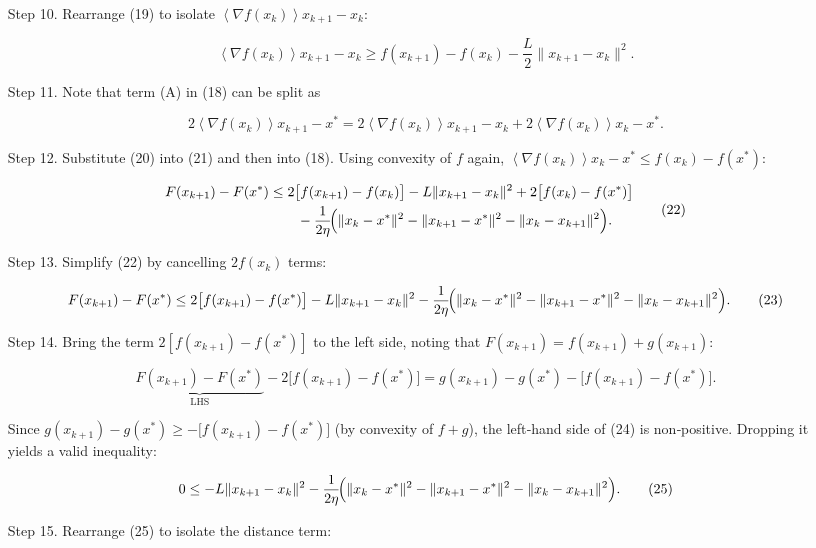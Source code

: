 \documentclass{article}
\newcommand{\inner}[1]{\left\langle #1\right\rangle}
\begin{document}
\begin{enumerate}
\item[Step 10.] Rearrange (19) to isolate $\inner{\nabla f(x_{k})}{x_{k+1}-x_{k}}$:

\[
\inner{\nabla f(x_{k})}{x_{k+1}-x_{k}}
\ge f(x_{k+1})-f(x_{k})-\frac{L}{2}\|x_{k+1}-x_{k}\|^{2}.
\tag{20}
\]

\item[Step 11.] Note that term (A) in (18) can be split as

\[
2\inner{\nabla f(x_{k})}{x_{k+1}-x^{*}}
=2\inner{\nabla f(x_{k})}{x_{k+1}-x_{k}}
+2\inner{\nabla f(x_{k})}{x_{k}-x^{*}}.
\tag{21}
\]

\item[Step 12.] Substitute (20) into (21) and then into (18).  Using convexity of $f$ again,
$\inner{\nabla f(x_{k})}{x_{k}-x^{*}}\le f(x_{k})-f(x^{*})$:

\[
\begin{aligned}
F(x_{k+1})-F(x^{*})
&\le
2\bigl[f(x_{k+1})-f(x_{k})\bigr]
- L\|x_{k+1}-x_{k}\|^{2}
+2\bigl[f(x_{k})-f(x^{*})\bigr] \\
&\qquad
-\frac{1}{2\eta}\!\Bigl(\|x_{k}-x^{*}\|^{2}-\|x_{k+1}-x^{*}\|^{2}
-\|x_{k}-x_{k+1}\|^{2}\Bigr).
\end{aligned}
\tag{22}
\]

\item[Step 13.] Simplify (22) by cancelling $2f(x_{k})$ terms:

\[
F(x_{k+1})-F(x^{*})
\le
2\bigl[f(x_{k+1})-f(x^{*})\bigr]
- L\|x_{k+1}-x_{k}\|^{2}
-\frac{1}{2\eta}\!\Bigl(\|x_{k}-x^{*}\|^{2}-\|x_{k+1}-x^{*}\|^{2}
-\|x_{k}-x_{k+1}\|^{2}\Bigr).
\tag{23}
\]

\item[Step 14.] Bring the term $2[f(x_{k+1})-f(x^{*})]$ to the left side, noting that $F(x_{k+1})=f(x_{k+1})+g(x_{k+1})$:

\[
\underbrace{F(x_{k+1})-F(x^{*})}_{\text{LHS}}
-2\bigl[f(x_{k+1})-f(x^{*})\bigr]
= g(x_{k+1})-g(x^{*})- \bigl[f(x_{k+1})-f(x^{*})\bigr].
\tag{24}
\]

Since $g(x_{k+1})-g(x^{*})\ge -\bigl[f(x_{k+1})-f(x^{*})\bigr]$ (by convexity of $f+g$), the left‑hand side of (24) is non‑positive.  Dropping it yields a valid inequality:

\[
0\le
- L\|x_{k+1}-x_{k}\|^{2}
-\frac{1}{2\eta}\!\Bigl(\|x_{k}-x^{*}\|^{2}-\|x_{k+1}-x^{*}\|^{2}
-\|x_{k}-x_{k+1}\|^{2}\Bigr).
\tag{25}
\]

\item[Step 15.] Rearrange (25) to isolate the distance term:


\end{enumerate}
\end{document}
